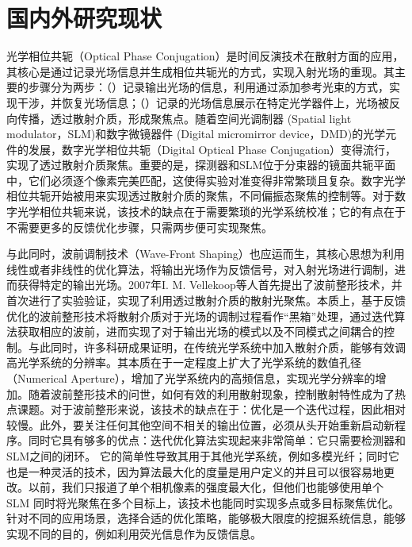\section{国内外研究现状}

光学相位共轭（Optical Phase Conjugation）是时间反演技术在散射方面的应用\cite{derode_robust_1995,draeger_one_channel_1997,leith_holographic_1966,fink_acoustic_2001}，其核心是通过记录光场信息并生成相位共轭光的方式，实现入射光场的重现。其主要的步骤分为两步：（）记录输出光场的信息，利用通过添加参考光束的方式，实现干涉，并恢复光场信息；（）记录的光场信息展示在特定光学器件上，光场被反向传播，透过散射介质，形成聚焦点。随着空间光调制器 (Spatial light modulator，SLM)和数字微镜器件 (Digital micromirror device，DMD)的光学元件的发展，数字光学相位共轭（Digital Optical Phase Conjugation）变得流行，实现了透过散射介质聚焦\cite{yaqoob_optical_2008,paurisse_phase_2009,cui_implementation_2010,lhermite_coherent_2010}。重要的是，探测器和SLM位于分束器的镜面共轭平面中，它们必须逐个像素完美匹配，这使得实验对准变得非常繁琐且复杂。数字光学相位共轭开始被用来实现透过散射介质的聚焦，不同偏振态聚焦的控制等。对于数字光学相位共轭来说，该技术的缺点在于需要繁琐的光学系统校准；它的有点在于不需要更多的反馈优化步骤，只需两步便可实现聚焦。

与此同时，波前调制技术（Wave-Front Shaping）\cite{Vellekoop2007}也应运而生，其核心思想为利用线性或者非线性的优化算法，将输出光场作为反馈信号，对入射光场进行调制，进而获得特定的输出光场。2007年I. M. Vellekoop等人\cite{Vellekoop2007}首先提出了波前整形技术，并首次进行了实验验证，实现了利用透过散射介质的散射光聚焦。本质上，基于反馈优化的波前整形技术将散射介质对于光场的调制过程看作“黑箱”处理，通过迭代算法获取相应的波前，进而实现了对于输出光场的模式以及不同模式之间耦合的控制。与此同时，许多科研成果证明，在传统光学系统中加入散射介质，能够有效调高光学系统的分辨率\cite{vellekoop_exploiting_2010,choi_overcoming_2011}。其本质在于一定程度上扩大了光学系统的数值孔径（Numerical Aperture），增加了光学系统内的高频信息，实现光学分辨率的增加。随着波前整形技术的问世，如何有效的利用散射现象，控制散射特性成为了热点课题。对于波前整形来说，该技术的缺点在于：优化是一个迭代过程，因此相对较慢。此外，要关注任何其他空间不相关的输出位置，必须从头开始重新启动新程序。同时它具有够多的优点：迭代优化算法实现起来非常简单：它只需要检测器和SLM之间的闭环。 它的简单性导致其用于其他光学系统，例如多模光纤；同时它也是一种灵活的技术，因为算法最大化的度量是用户定义的并且可以很容易地更改。以前，我们只报道了单个相机像素的强度最大化，但他们也能够使用单个 SLM 同时将光聚焦在多个目标上，该技术也能同时实现多点或多目标聚焦优化。针对不同的应用场景，选择合适的优化策略，能够极大限度的挖掘系统信息，能够实现不同的目的，例如利用荧光信息作为反馈信息\cite{boniface_non_invasive_2019}。

